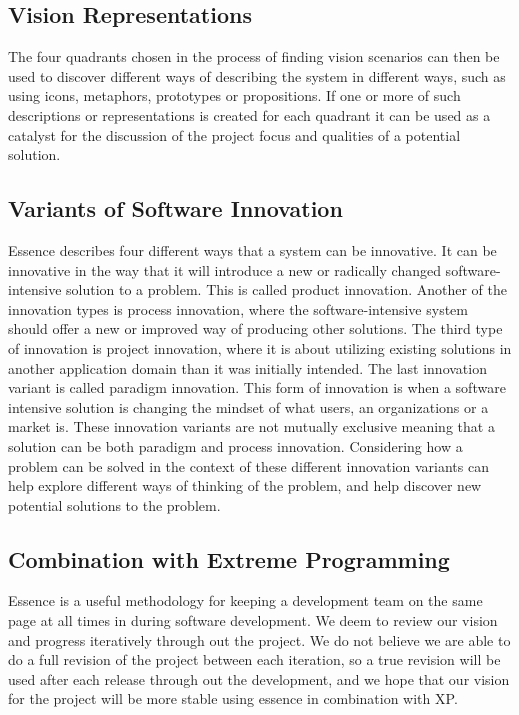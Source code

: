 \subsection{Vision Representations}
\label{sub:vision_representations}

The four quadrants chosen in the process of finding vision scenarios can then be used to discover different ways of describing the system in different ways, such as using icons, metaphors, prototypes or propositions. If one or more of such descriptions or representations is created for each quadrant it can be used as a catalyst for the discussion of the project focus and qualities of a potential solution. 

\subsection{Variants of Software Innovation}
\label{sub:essence_innovation_variants}

Essence describes four different ways that a system can be innovative. It can be innovative in the way that it will introduce a new or radically changed software-intensive solution to a problem. This is called product innovation. Another of the innovation types is process innovation, where the software-intensive system should offer a new or improved way of producing other solutions. The third type of innovation is project innovation, where it is about utilizing existing solutions in another application domain than it was initially intended. The last innovation variant is called paradigm innovation. This form of innovation is when a software intensive solution is changing the mindset of what users, an organizations or a market is. These innovation variants are not mutually exclusive meaning that a solution can be both paradigm and process innovation. Considering how a problem can be solved in the context of these different innovation variants can help explore different ways of thinking of the problem, and help discover new potential solutions to the problem.


\subsection{Combination with Extreme Programming}
\label{sub:combination_with_extreme_programming}
Essence is a useful methodology for keeping a development team on the same page at all times in during software development. We deem to review our vision and progress iteratively through out the project. We do not believe we are able to do a full revision of the project between each iteration, so a true revision will be used after each release through out the development, and we hope that our vision for the project will be more stable using essence in combination with XP.

